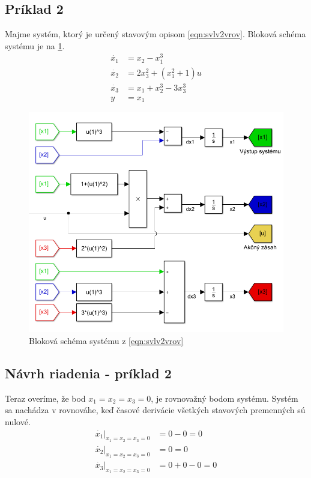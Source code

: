 \documentclass[../main.tex]{subfiles}
\begin{document}
	\subsection*{Príklad 2}
	Majme systém, ktorý je určený stavovým opisom \cref{eqn:svlv2vrov}. Bloková schéma systému je na \cref{fig:svlvv2schfig}.
	\begin{equation}
		\begin{aligned}
		\dot{x_1} &= x_2 - x_1^3\\
		\dot{x_2} &= 2x_3^2 + (x_1^2+1)u \\
		\dot{x_3} &= x_1 + x_2^3 - 3x_3^3 \\
		y &= x_1
		\end{aligned}
		\label{eqn:svlv2vrov}
	\end{equation}
	\begin{figure}[h!]
		\centering
		\includegraphics[width=0.8\linewidth]{sysPr2}
		\caption{Bloková schéma systému z \cref{eqn:svlv2vrov}}
		\label{fig:svlvv2schfig}
	\end{figure}
	\subsection*{Návrh riadenia - príklad 2}
	Teraz overíme, že bod  $x_1 = x_2 = x_3 = 0 $, je rovnovažný bodom systému. Systém sa nachádza v rovnováhe, keď časové derivácie všetkých stavových premenných sú nulové. 
	\begin{equation}
		\begin{aligned}
		\dot{x_1}|_{x_1 = x_2 = x_3 = 0} &= 0 - 0 = 0 \\
		\dot{x_2}|_{x_1 = x_2 = x_3 = 0} &= 0    = 0 \\
		\dot{x_3}|_{x_1 = x_2 = x_3 = 0} &= 0 + 0 - 0 = 0 \\
		\end{aligned}
		\label{eqn:svlvvPr2OvereniePB}
	\end{equation}
	
\end{document}
